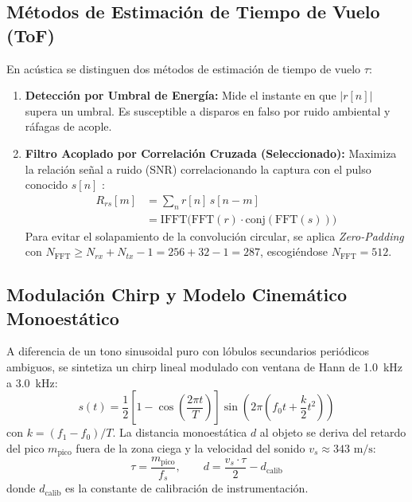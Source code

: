 \documentclass[journal]{IEEEtran}
\begin{document}
\subsection{M\'etodos de Estimaci\'on de Tiempo de Vuelo (ToF)}
En ac\'ustica se distinguen dos m\'etodos de estimaci\'on de tiempo de vuelo $\tau$:
\begin{enumerate}
\item \textbf{Detecci\'on por Umbral de Energ\'ia:} Mide el instante en que $|r[n]|$ supera un umbral. Es susceptible a disparos en falso por ruido ambiental y r\'afagas de acople.
\item \textbf{Filtro Acoplado por Correlaci\'on Cruzada (Seleccionado):} Maximiza la relaci\'on se\~nal a ruido (SNR) correlacionando la captura con el pulso conocido $s[n]$ \cite{KnappCarter1976}:
\begin{equation} \label{eq:correlacion}
\begin{aligned}
R_{rs}[m] &= \sum_{n} r[n] \, s[n - m] \\
&= \text{IFFT}\Big( \text{FFT}(r) \cdot \text{conj}(\text{FFT}(s)) \Big)
\end{aligned}
\end{equation}
Para evitar el solapamiento de la convoluci\'on circular, se aplica \textit{Zero-Padding} con $N_{\text{FFT}} \ge N_{rx} + N_{tx} - 1 = 256 + 32 - 1 = 287$, escogi\'endose $N_{\text{FFT}} = 512$.
\end{enumerate}

\subsection{Modulaci\'on Chirp y Modelo Cinem\'atico Monoest\'atico}
A diferencia de un tono sinusoidal puro con l\'obulos secundarios peri\'odicos ambiguos, se sintetiza un chirp lineal modulado con ventana de Hann de 1.0~kHz a 3.0~kHz:
\begin{equation} \label{eq:chirp}
s(t) = \frac{1}{2}\left[1 - \cos\left(\frac{2\pi t}{T}\right)\right] \sin\left(2\pi \left(f_0 t + \frac{k}{2} t^2\right)\right)
\end{equation}
con $k = (f_1 - f_0)/T$. La distancia monoest\'atica $d$ al objeto se deriva del retardo del pico $m_{\text{pico}}$ fuera de la zona ciega y la velocidad del sonido $v_s \approx 343\text{ m/s}$:
\begin{equation} \label{eq:distancia}
\tau = \frac{m_{\text{pico}}}{f_s}, \qquad d = \frac{v_s \cdot \tau}{2} - d_{\text{calib}}
\end{equation}
donde $d_{\text{calib}}$ es la constante de calibraci\'on de instrumentaci\'on.
\end{document}
